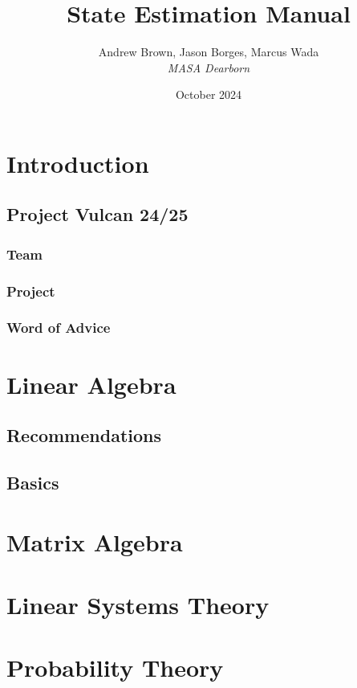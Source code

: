 \documentclass{article}
\title{\textbf{State Estimation Manual}}
\author{Andrew Brown, Jason Borges, Marcus Wada\\[1ex] \textit{MASA Dearborn}}
\date{October 2024}
\begin{document}
\maketitle
\newpage
\tableofcontents
\newpage


\section{Introduction}
\subsection{Project Vulcan 24/25}
\subsubsection{Team}
\subsubsection{Project}
\subsubsection{Word of Advice}

\section{Linear Algebra}
\subsection{Recommendations}
\subsection{Basics}


\section{Matrix Algebra}
\section{Linear Systems Theory}
\section{Probability Theory}
\end{document}
